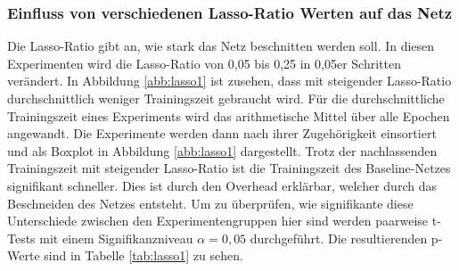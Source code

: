 \subsubsection{Einfluss von verschiedenen Lasso-Ratio Werten auf das Netz}
Die Lasso-Ratio gibt an, wie stark das Netz beschnitten werden soll. In diesen Experimenten wird die Lasso-Ratio von 0,05 bis 0,25 in 0,05er Schritten verändert. In Abbildung \ref{abb:lasso1} ist zusehen, dass mit steigender Lasso-Ratio durchschnittlich weniger Trainingszeit gebraucht wird. Für die durchschnittliche Trainingszeit eines Experiments wird das arithmetische Mittel über alle Epochen angewandt. Die Experimente werden dann nach ihrer Zugehörigkeit einsortiert und als Boxplot in Abbildung \ref{abb:lasso1} dargestellt. Trotz der nachlassenden Trainingszeit mit steigender Lasso-Ratio ist die Trainingszeit des Baseline-Netzes signifikant schneller. Dies ist durch den Overhead erklärbar, welcher durch das Beschneiden des Netzes entsteht.
Um zu überprüfen, wie signifikante diese Unterschiede zwischen den Experimentengruppen hier sind werden paarweise t-Tests mit einem Signifikanzniveau $\alpha=0,05$ durchgeführt. Die resultierenden p-Werte sind in Tabelle \ref{tab:lasso1} zu sehen.


